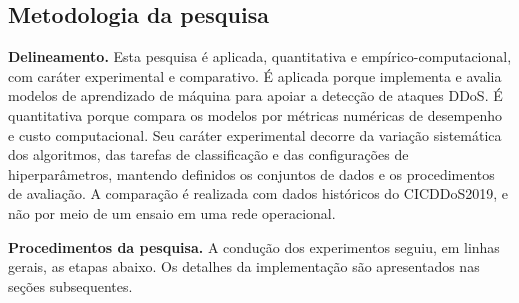\documentclass[
    12pt,                %
    openright,           %
    oneside,             %
    a4paper,             %
    english,             %
    brazil               %
]{abntex2}
\begin{document}

\subsection{Metodologia da pesquisa}
\label{sec:metodologia}

\textbf{Delineamento.} Esta pesquisa é aplicada, quantitativa e empírico-computacional, com caráter experimental e comparativo. É aplicada porque implementa e avalia modelos de aprendizado de máquina para apoiar a detecção de ataques DDoS. É quantitativa porque compara os modelos por métricas numéricas de desempenho e custo computacional. Seu caráter experimental decorre da variação sistemática dos algoritmos, das tarefas de classificação e das configurações de hiperparâmetros, mantendo definidos os conjuntos de dados e os procedimentos de avaliação. A comparação é realizada com dados históricos do CICDDoS2019, e não por meio de um ensaio em uma rede operacional.

\textbf{Procedimentos da pesquisa.} A condução dos experimentos seguiu, em linhas gerais, as etapas abaixo. Os detalhes da implementação são apresentados nas seções subsequentes.
\end{document}
